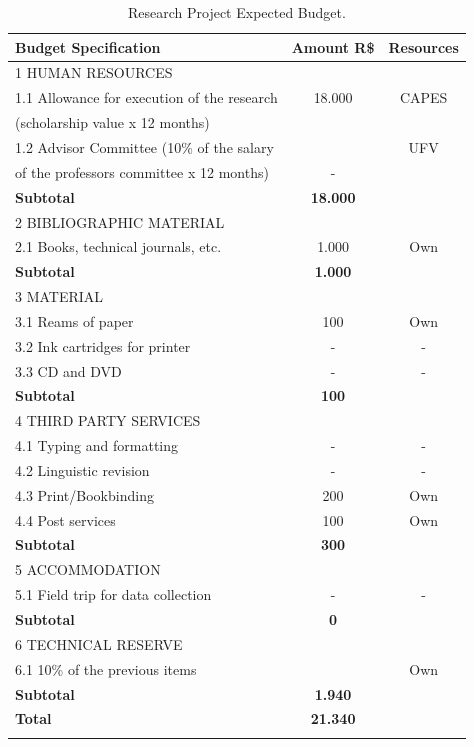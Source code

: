 \documentclass[a4paper,12pt]{article}
\begin{document}
\begin{longtable}{lcc} %
\hline
\textbf{Budget Specification} & \textbf{Amount R\$} & \textbf{Resources} \\
\hline
1 HUMAN RESOURCES & & \\
1.1 Allowance for execution of the research & 18.000 & CAPES\\
 (scholarship value x 12 months) & & \\
1.2 Advisor Committee (10\% of the salary  & & UFV\\
of the professors committee x 12 months) & - &  \\
\textbf{Subtotal} & \textbf{18.000} & \\
\hline
2 BIBLIOGRAPHIC MATERIAL & & \\
2.1 Books, technical journals, etc. & 1.000 & Own\\
\textbf{Subtotal} & \textbf{1.000} & \\
\hline
3 MATERIAL & & \\  
3.1 Reams of paper & 100 & Own \\ 
3.2 Ink cartridges for printer & - & - \\ 
3.3  CD and DVD  & - & - \\ 
\textbf{Subtotal} & \textbf{100} & \\
\hline
4 THIRD PARTY SERVICES & & \\  
4.1 Typing and formatting & - & - \\ 
4.2 Linguistic revision & - & - \\ 
4.3 Print/Bookbinding & 200 & Own \\ 
4.4 Post services & 100 & Own \\ 
\textbf{Subtotal} & \textbf{300} & \\
\hline
5 ACCOMMODATION & & \\
5.1 Field trip for data collection & - & - \\
\textbf{Subtotal} & \textbf{0} & \\
\hline
6 TECHNICAL RESERVE & & \\
6.1 10\% of the previous items & & Own\\ 
\textbf{Subtotal} & \textbf{1.940} & \\
\hline 
\textbf{Total} & \textbf{21.340} & \\
\hline
\caption{Research Project Expected Budget.}
\end{longtable}



\end{document}
